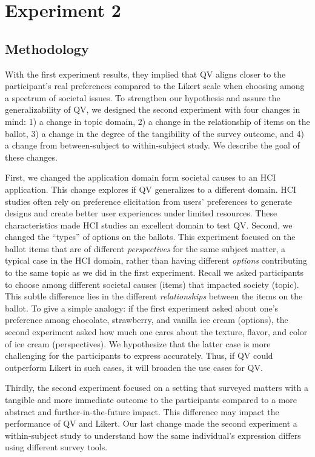 \section{Experiment 2}
\subsection{Methodology} \label{method-2}
With the first experiment results, they implied that QV aligns closer to the participant's real preferences compared to the Likert scale when choosing among a spectrum of societal issues. To strengthen our hypothesis and assure the generalizability of QV, we designed the second experiment with four changes in mind: 1) a change in topic domain, 2) a change in the relationship of items on the ballot, 3) a change in the degree of the tangibility of the survey outcome, and 4) a change from between-subject to within-subject study. We describe the goal of these changes.

First, we changed the application domain form societal causes to an HCI application. This change explores if QV generalizes to a different domain. HCI studies often rely on preference elicitation from users' preferences to generate designs and create better user experiences under limited resources. These characteristics made HCI studies an excellent domain to test QV. Second, we changed the ``types'' of options on the ballots. This experiment focused on the ballot items that are of different \textit{perspectives} for the same subject matter, a typical case in the HCI domain, rather than having different \textit{options} contributing to the same topic as we did in the first experiment. Recall we asked participants to choose among different societal causes (items) that impacted society (topic). This subtle difference lies in the different \textit{relationships} between the items on the ballot. To give a simple analogy: if the first experiment asked about one's preference among chocolate, strawberry, and vanilla ice cream (options), the second experiment asked how much one cares about the texture, flavor, and color of ice cream (perspectives). We hypothesize that the latter case is more challenging for the participants to express accurately. Thus, if QV could outperform Likert in such cases, it will broaden the use cases for QV.

Thirdly, the second experiment focused on a setting that surveyed matters with a tangible and more immediate outcome to the participants compared to a more abstract and further-in-the-future impact. This difference may impact the performance of QV and Likert. Our last change made the second experiment a within-subject study to understand how the same individual's expression differs using different survey tools.

